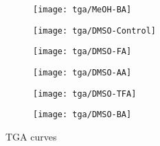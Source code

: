 \begin{figure}[htb]\ContinuedFloat{}

    \begin{subfigure}{0.45\linewidth}
        \texttt{[image: tga/MeOH-BA]}%
        \label{appx:def:fgr:meoh-ba}
    \end{subfigure}
    \begin{subfigure}{0.45\linewidth}
        \texttt{[image: tga/DMSO-Control]}%
        \label{appx:def:fgr:dmso-cont}
    \end{subfigure}

    \begin{subfigure}{0.45\linewidth}
        \texttt{[image: tga/DMSO-FA]}%
        \label{appx:def:fgr:dmso-fa}
    \end{subfigure}
    \begin{subfigure}{0.45\linewidth}
        \texttt{[image: tga/DMSO-AA]}%
        \label{appx:def:fgr:dmso-aa}
    \end{subfigure}

    \begin{subfigure}{0.45\linewidth}
        \texttt{[image: tga/DMSO-TFA]}%
        \label{appx:def:fgr:dmso-tfa}
    \end{subfigure}
    \begin{subfigure}{0.45\linewidth}
        \texttt{[image: tga/DMSO-BA]}%
        \label{appx:def:fgr:dmso-ba}
    \end{subfigure}

    \caption{TGA curves}%
    \label{appx:def:fgr:calomil100}
\end{figure}